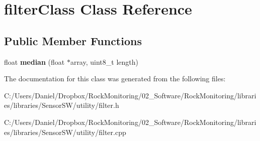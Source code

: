 \hypertarget{classfilter_class}{}\section{filter\+Class Class Reference}
\label{classfilter_class}
\subsection*{Public Member Functions}
\begin{DoxyCompactItemize}
\item 
float {\bfseries median} (float $\ast$array, uint8\+\_\+t length)\hypertarget{classfilter_class_a32e814e3e827762860aeec0cedee393f}{}\label{classfilter_class_a32e814e3e827762860aeec0cedee393f}

\end{DoxyCompactItemize}


The documentation for this class was generated from the following files\+:\begin{DoxyCompactItemize}
\item 
C\+:/\+Users/\+Daniel/\+Dropbox/\+Rock\+Monitoring/02\+\_\+\+Software/\+Rock\+Monitoring/libraries/libraries/\+Sensor\+S\+W/utility/filter.\+h\item 
C\+:/\+Users/\+Daniel/\+Dropbox/\+Rock\+Monitoring/02\+\_\+\+Software/\+Rock\+Monitoring/libraries/libraries/\+Sensor\+S\+W/utility/filter.\+cpp\end{DoxyCompactItemize}
